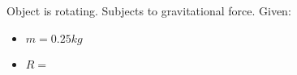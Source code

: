 

Object is rotating. Subjects to gravitational force.
Given: 

\begin{itemize}
    \item $  m  = 0.25kg $
    \item $ R =  $
\end{itemize}
